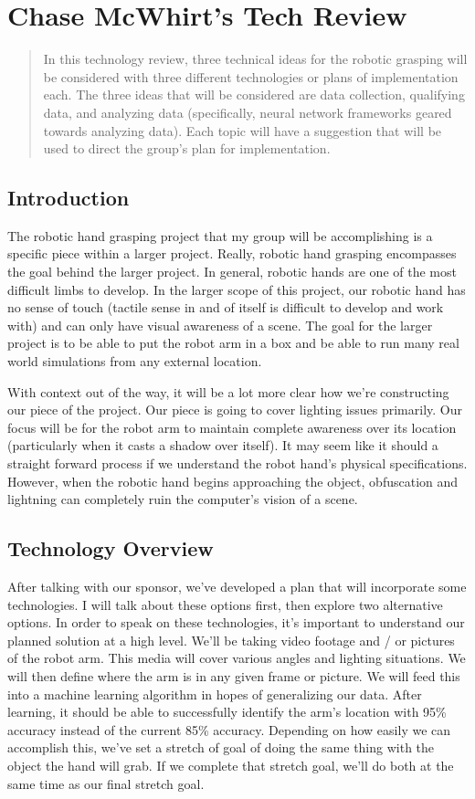 \documentclass[10pt,journal,compsoc, draftclsnofoot,onecolumn]{IEEEtran}
\begin{document}
\newpage
\section{Chase McWhirt's Tech Review}
\begin{abstract}
In this technology review, three technical ideas for the robotic grasping will be considered with three different technologies or plans of implementation each.
The three ideas that will be considered are data collection, qualifying data, and analyzing data (specifically, neural network frameworks geared towards analyzing data).
Each topic will have a suggestion that will be used to direct the group's plan for implementation.
\end{abstract}

\subsection{Introduction}
The robotic hand grasping project that my group will be accomplishing is a specific piece within a larger project.
Really, robotic hand grasping encompasses the goal behind the larger project.
In general, robotic hands are one of the most difficult limbs to develop.
In the larger scope of this project, our robotic hand has no sense of touch (tactile sense in and of itself is difficult to develop and work with) and can only have visual awareness of a scene.
The goal for the larger project is to be able to put the robot arm in a box and be able to run many real world simulations from any external location.

With context out of the way, it will be a lot more clear how we're constructing our piece of the project.
Our piece is going to cover lighting issues primarily.
Our focus will be for the robot arm to maintain complete awareness over its location (particularly when it casts a shadow over itself).
It may seem like it should a straight forward process if we understand the robot hand's physical specifications.
However, when the robotic hand begins approaching the object, obfuscation and lightning can completely ruin the computer's vision of a scene.

\subsection{Technology Overview}
After talking with our sponsor, we've developed a plan that will incorporate some technologies.
I will talk about these options first, then explore two alternative options.
In order to speak on these technologies, it's important to understand our planned solution at a high level.
We'll be taking video footage and / or pictures of the robot arm.
This media will cover various angles and lighting situations.
We will then define where the arm is in any given frame or picture.
We will feed this into a machine learning algorithm in hopes of generalizing our data.
After learning, it should be able to successfully identify the arm's location with 95\% accuracy instead of the current 85\% accuracy.
Depending on how easily we can accomplish this, we've set a stretch of goal of doing the same thing with the object the hand will grab.
If we complete that stretch goal, we'll do both at the same time as our final stretch goal.
\end{document}
